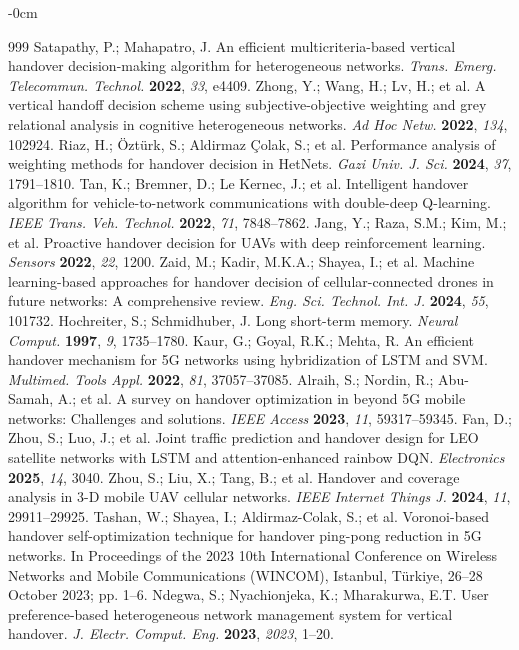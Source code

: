 \begin{adjustwidth}{-\extralength}{0cm}
\begin{thebibliography}{999}
Satapathy, P.; Mahapatro, J. An efficient multicriteria-based vertical handover decision-making algorithm for heterogeneous networks. {\em Trans. Emerg. Telecommun. Technol.} {\bf 2022}, {\em 33}, e4409.
Zhong, Y.; Wang, H.; Lv, H.; et al. A vertical handoff decision scheme using subjective-objective weighting and grey relational analysis in cognitive heterogeneous networks. {\em Ad Hoc Netw.} {\bf 2022}, {\em 134}, 102924.
Riaz, H.; Öztürk, S.; Aldirmaz Çolak, S.; et al. Performance analysis of weighting methods for handover decision in HetNets. {\em Gazi Univ. J. Sci.} {\bf 2024}, {\em 37}, 1791--1810.
Tan, K.; Bremner, D.; Le Kernec, J.; et al. Intelligent handover algorithm for vehicle-to-network communications with double-deep Q-learning. {\em IEEE Trans. Veh. Technol.} {\bf 2022}, {\em 71}, 7848--7862.
Jang, Y.; Raza, S.M.; Kim, M.; et al. Proactive handover decision for UAVs with deep reinforcement learning. {\em Sensors} {\bf 2022}, {\em 22}, 1200.
Zaid, M.; Kadir, M.K.A.; Shayea, I.; et al. Machine learning-based approaches for handover decision of cellular-connected drones in future networks: A comprehensive review. {\em Eng. Sci. Technol. Int. J.} {\bf 2024}, {\em 55}, 101732.
Hochreiter, S.; Schmidhuber, J. Long short-term memory. {\em Neural Comput.} {\bf 1997}, {\em 9}, 1735--1780.
Kaur, G.; Goyal, R.K.; Mehta, R. An efficient handover mechanism for 5G networks using hybridization of LSTM and SVM. {\em Multimed. Tools Appl.} {\bf 2022}, {\em 81}, 37057--37085.
Alraih, S.; Nordin, R.; Abu-Samah, A.; et al. A survey on handover optimization in beyond 5G mobile networks: Challenges and solutions. {\em IEEE Access} {\bf 2023}, {\em 11}, 59317--59345.
Fan, D.; Zhou, S.; Luo, J.; et al. Joint traffic prediction and handover design for LEO satellite networks with LSTM and attention-enhanced rainbow DQN. {\em Electronics} {\bf 2025}, {\em 14}, 3040.
Zhou, S.; Liu, X.; Tang, B.; et al. Handover and coverage analysis in 3-D mobile UAV cellular networks. {\em IEEE Internet Things J.} {\bf 2024}, {\em 11}, 29911--29925.
Tashan, W.; Shayea, I.; Aldirmaz-Colak, S.; et al. Voronoi-based handover self-optimization technique for handover ping-pong reduction in 5G networks. In Proceedings of the 2023 10th International Conference on Wireless Networks and Mobile Communications (WINCOM), Istanbul, Türkiye, 26--28 October 2023; pp. 1--6.
Ndegwa, S.; Nyachionjeka, K.; Mharakurwa, E.T. User preference-based heterogeneous network management system for vertical handover. {\em J. Electr. Comput. Eng.} {\bf 2023}, {\em 2023}, 1--20.

\end{thebibliography}
\end{adjustwidth}
